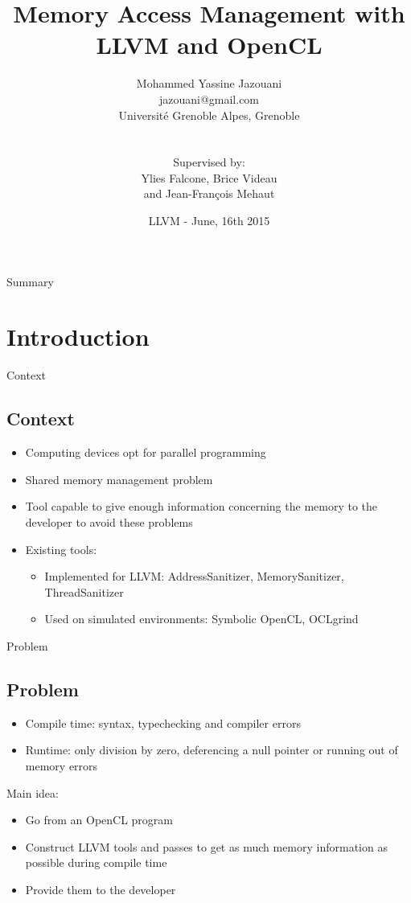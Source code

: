 \documentclass{beamer}
\title{Memory Access Management with LLVM and OpenCL}
\author{Mohammed Yassine Jazouani \\
jazouani@gmail.com \\
Université Grenoble Alpes, Grenoble\\
\\ \\
Supervised by: \\
Ylies Falcone, Brice Videau \\
and Jean-Fran\c{c}ois Mehaut\\}
\date{LLVM - June, 16th 2015}
\begin{document}
\begin{frame}
  \titlepage
\end{frame}

\begin{frame}{Summary}
  \tableofcontents[hideallsubsections]
\end{frame}



\section{Introduction}

\begin{frame}{Context}
\subsection{Context}
\begin{itemize}
\item Computing devices opt for parallel programming
\item Shared memory management problem
\item Tool capable to give enough information concerning the memory to the developer to avoid these problems
\item Existing tools: 
    \begin{itemize}
    \item Implemented for LLVM: AddressSanitizer, MemorySanitizer, ThreadSanitizer
    \item Used on simulated environments: Symbolic OpenCL, OCLgrind
    \end{itemize}
\end{itemize}
\end{frame}

\begin{frame}{Problem}
\subsection{Problem}
\begin{itemize}
\item Compile time: syntax, typechecking and compiler errors
\item Runtime: only division by zero, deferencing a null pointer or running out of memory errors
\end{itemize}

Main idea:  
\begin{itemize}
\item Go from an OpenCL program
\item Construct LLVM tools and passes to get as much
memory information as possible during compile time
\item Provide them to the developer
\end{itemize}
\end{frame}
\end{document}

